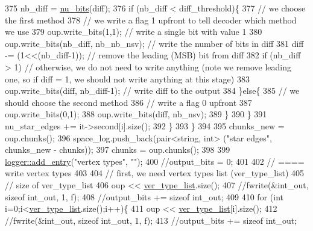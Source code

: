 \begin{DoxyCode}
375         nb\_diff = \hyperlink{bitstream_8cpp_a9dfce6f51e3febb3973aa3b16c2fecb4}{nu\_bits}(diff);
376         \textcolor{keywordflow}{if} (nb\_diff < diff\_threshold)\{
377           \textcolor{comment}{// we choose the first method}
378           \textcolor{comment}{// we write a flag 1 upfront to tell decoder which method we use}
379           oup.write\_bits(1,1); \textcolor{comment}{// write a single bit with value 1}
380           oup.write\_bits(nb\_diff, nb\_nb\_nsv); \textcolor{comment}{// write the number of bits in diff }
381           diff -= (1<<(nb\_diff-1)); \textcolor{comment}{// remove the leading (MSB) bit from diff}
382           \textcolor{keywordflow}{if} (nb\_diff > 1) \textcolor{comment}{// otherwise, we do not need to write anything (note we remove leading one, so
       if diff = 1, we should not write anything at this stage)}
383             oup.write\_bits(diff, nb\_diff-1); \textcolor{comment}{// write diff to the output}
384         \}\textcolor{keywordflow}{else}\{
385           \textcolor{comment}{// we should choose the second method}
386           \textcolor{comment}{// write a flag 0 upfront}
387           oup.write\_bits(0,1);
388           oup.write\_bits(diff, nb\_nsv);
389         \}
390       \}
391       nu\_star\_edges += it->second[i].size();
392     \}
393   \}
394   
395   chunks\_new = oup.chunks();
396   space\_log.push\_back(pair<string, int> (\textcolor{stringliteral}{"star edges"}, chunks\_new - chunks));
397   chunks = oup.chunks();
398 
399   \hyperlink{classlogger_a710163deb17bc81f70d53d285b8ac9ac}{logger::add\_entry}(\textcolor{stringliteral}{"vertex types"}, \textcolor{stringliteral}{""});
400   \textcolor{comment}{//output\_bits = 0;}
401   
402   \textcolor{comment}{// ==== write vertex types}
403 
404   \textcolor{comment}{// first, we need vertex types list (ver\_type\_list)}
405   \textcolor{comment}{// size of ver\_type\_list}
406   oup <<  \hyperlink{classmarked__graph__compressed_af2e3e55223d436628a02758dfae88493}{ver\_type\_list}.size();
407   \textcolor{comment}{//fwrite(&int\_out, sizeof int\_out, 1, f);}
408   \textcolor{comment}{//output\_bits += sizeof int\_out;}
409 
410   \textcolor{keywordflow}{for} (\textcolor{keywordtype}{int} i=0;i<\hyperlink{classmarked__graph__compressed_af2e3e55223d436628a02758dfae88493}{ver\_type\_list}.size();i++)\{
411     oup << \hyperlink{classmarked__graph__compressed_af2e3e55223d436628a02758dfae88493}{ver\_type\_list}[i].size();
412     \textcolor{comment}{//fwrite(&int\_out, sizeof int\_out, 1, f);}
413     \textcolor{comment}{//output\_bits += sizeof int\_out;}

\end{DoxyCode}
